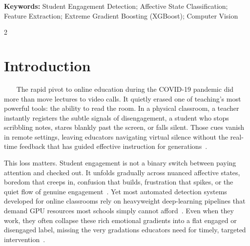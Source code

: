 \begin{mdframed}[
    linecolor=povteal,
    linewidth=.4pt,
    topline=false,
    bottomline=false,
    leftline=false,
    rightline=false,
    innertopmargin=6pt,
    innerbottommargin=6pt,
    innerleftmargin=6pt,
    innerrightmargin=6pt,
  ]
  \noindent\textbf{Keywords:}
  Student Engagement Detection; Affective State Classification; Feature Extraction; Extreme Gradient Boosting (XGBoost); Computer Vision
\end{mdframed}

\vspace{9pt}

\setlength{\columnsep}{.7cm} %
\begin{multicols}{2}
  \setlength{\parindent}{1em}
  \setlength{\parskip}{8pt}

  \section{Introduction}

  \renewcommand{\thefootnote}{}
  \renewcommand{\thefootnote}{\arabic{footnote}}
  ~~~
  The rapid pivot to online education during the COVID-19 pandemic did more than move lectures to video calls. It quietly erased one of teaching's most powerful tools: the ability to read the room. In a physical classroom, a teacher instantly registers the subtle signals of disengagement, a student who stops scribbling notes, stares blankly past the screen, or falls silent. Those cues vanish in remote settings, leaving educators navigating virtual silence without the real-time feedback that has guided effective instruction for generations~\cite{prakasha2023student, Hollister2022EngagementIO}.

  This loss matters. Student engagement is not a binary switch between paying attention and checked out. It unfolds gradually across nuanced affective states, boredom that creeps in, confusion that builds, frustration that spikes, or the quiet flow of genuine engagement~\cite{Gupta2016DAiSEETU}. Yet most automated detection systems developed for online classrooms rely on heavyweight deep-learning pipelines that demand GPU resources most schools simply cannot afford~\cite{Zhang2019AnNE, Su2024LeveragingPA, Khenkar2023DeepAO}. Even when they work, they often collapse these rich emotional gradients into a flat engaged or disengaged label, missing the very gradations educators need for timely, targeted intervention~\cite{Santoni2023ConvolutionalNN, Malekshahi2024AGM}.


\end{multicols}
